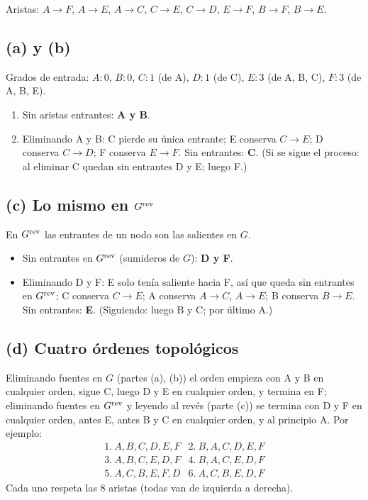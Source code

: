 \begin{center}

\small Aristas: $A\!\to\!F$, $A\!\to\!E$, $A\!\to\!C$, $C\!\to\!E$, $C\!\to\!D$, $E\!\to\!F$, $B\!\to\!F$, $B\!\to\!E$.
\end{center}

\subsection*{(a) y (b)}
Grados de entrada: $A\!:\!0$, $B\!:\!0$, $C\!:\!1$ (de A), $D\!:\!1$ (de C), $E\!:\!3$ (de A, B, C), $F\!:\!3$
(de A, B, E).
\begin{enumerate}[label=(\alph*)]
\item Sin aristas entrantes: \textbf{A y B}.
\item Eliminando A y B: C pierde su única entrante; E conserva $C\to E$; D conserva $C\to D$; F conserva
$E\to F$. Sin entrantes: \textbf{C}. (Si se sigue el proceso: al eliminar C quedan sin entrantes D y E;
luego F.)
\end{enumerate}

\subsection*{(c) Lo mismo en $G^{\mathrm{rev}}$}
En $G^{\mathrm{rev}}$ las entrantes de un nodo son las salientes en $G$.
\begin{itemize}[nosep]
\item Sin entrantes en $G^{\mathrm{rev}}$ (sumideros de $G$): \textbf{D y F}.
\item Eliminando D y F: E solo tenía saliente hacia F, así que queda sin entrantes en $G^{\mathrm{rev}}$; C conserva
$C\to E$; A conserva $A\to C$, $A\to E$; B conserva $B\to E$. Sin entrantes: \textbf{E}. (Siguiendo: luego
B y C; por último A.)
\end{itemize}

\subsection*{(d) Cuatro órdenes topológicos}
Eliminando fuentes en $G$ (partes (a), (b)) el orden empieza con A y B en cualquier orden, sigue C, luego
D y E en cualquier orden, y termina en F; eliminando fuentes en $G^{\mathrm{rev}}$ y leyendo al revés (parte (c))
se termina con D y F en cualquier orden, antes E, antes B y C en cualquier orden, y al principio A.
Por ejemplo:
\[
\begin{array}{ll}
1.\ A,B,C,D,E,F & 2.\ B,A,C,D,E,F\\
3.\ A,B,C,E,D,F & 4.\ B,A,C,E,D,F\\
5.\ A,C,B,E,F,D & 6.\ A,C,B,E,D,F
\end{array}
\]
Cada uno respeta las 8 aristas (todas van de izquierda a derecha).

